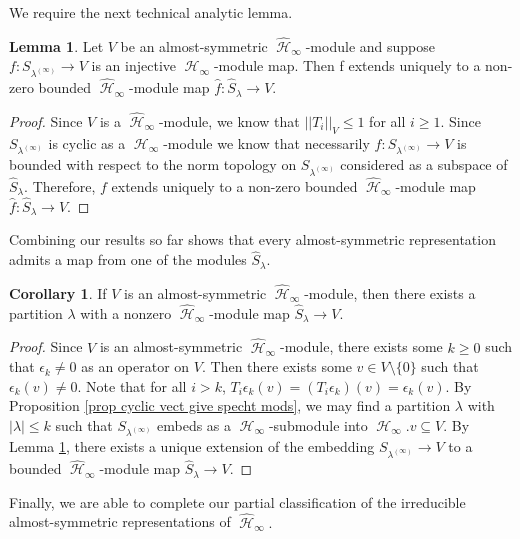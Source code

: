 \documentclass[12pt,reqno]{amsart}
\theoremstyle{definition}
\newtheorem{lem}[thm]{Lemma}
\newtheorem{cor}[thm]{Corollary}
\DeclareMathOperator{\cH}{\mathcal{H}}
\begin{document}
We require the next technical analytic lemma.

\begin{lem}\label{lem extension of reps}
    Let $V$ be an almost-symmetric $\widehat{\cH}_{\infty}$-module and suppose $f: S_{\lambda^{(\infty)}} \rightarrow V$ is an injective $\cH_{\infty}$-module map. Then f extends uniquely to a non-zero bounded $\widehat{\cH}_{\infty}$-module map $\hat{f}: \hat{S}_{\lambda} \rightarrow V.$
\end{lem}
\begin{proof}
    Since $V$ is a $\widehat{\cH}_{\infty}$-module, we know that $||T_i||_{V} \leq 1$ for all $i \geq 1.$ Since $S_{\lambda^{(\infty)}}$ is cyclic as a $\cH_{\infty}$-module we know that necessarily $f: S_{\lambda^{(\infty)}}\rightarrow V$ is bounded with respect to the norm topology on $S_{\lambda^{(\infty)}}$ considered as a subspace of $\hat{S}_{\lambda}$. Therefore, $f$ extends uniquely to a non-zero bounded $\widehat{\cH}_{\infty}$-module map $\hat{f}:\hat{S}_{\lambda} \rightarrow V.$
\end{proof}

Combining our results so far shows that every almost-symmetric representation admits a map from one of the modules $\hat{S}_{\lambda}.$

\begin{cor}\label{cor extension of reps}
    If $V$ is an almost-symmetric $\widehat{\cH}_{\infty}$-module, then there exists a partition $\lambda$ with a nonzero $\widehat{\cH}_{\infty}$-module map $\hat{S}_{\lambda} \rightarrow V.$ 
\end{cor}
\begin{proof}
    Since $V$ is an almost-symmetric $\widehat{\cH}_{\infty}$-module, there exists some $k \geq 0$ such that $\epsilon_k \neq 0$ as an operator on $V.$ Then there exists some $v \in V \setminus \{0\}$ such that $\epsilon_k(v) \neq 0.$ Note that for all $i > k$, 
    $T_i \epsilon_k(v) = (T_i\epsilon_k)(v) = \epsilon_k(v)$. By Proposition \ref{prop cyclic vect give specht mods}, we may find a partition $\lambda$ with $|\lambda| \leq k$ such that $S_{\lambda^{(\infty)}}$ embeds as a $\cH_{\infty}$-submodule into $\cH_{\infty}.v \subseteq V.$ By Lemma \ref{lem extension of reps}, there exists a unique extension of the embedding $S_{\lambda^{(\infty)}} \rightarrow V$ to a bounded $\widehat{\cH}_{\infty}$-module map $\hat{S}_{\lambda} \rightarrow V$. 
\end{proof} 

Finally, we are able to complete our partial classification of the irreducible almost-symmetric representations of $\widehat{\cH}_{\infty}.$
\end{document}
